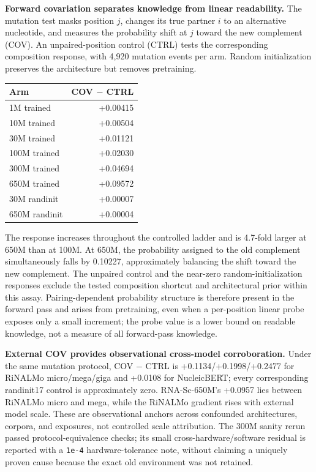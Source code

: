\textbf{Forward covariation separates knowledge from linear readability.} The mutation test masks position \(j\), changes its true partner \(i\) to an alternative nucleotide, and measures the probability shift at \(j\) toward the new complement (COV). An unpaired-position control (CTRL) tests the corresponding composition response, with 4,920 mutation events per arm. Random initialization preserves the architecture but removes pretraining.

\begin{longtable}[]{@{}lr@{}}
\toprule
Arm & COV \(-\) CTRL \\
\midrule
\endhead
1M trained & +0.00415 \\
10M trained & +0.00504 \\
30M trained & +0.01121 \\
100M trained & +0.02030 \\
300M trained & +0.04694 \\
650M trained & +0.09572 \\
30M randinit & +0.00007 \\
650M randinit & +0.00004 \\
\bottomrule
\end{longtable}

The response increases throughout the controlled ladder and is 4.7-fold larger at 650M than at 100M. At 650M, the probability assigned to the old complement simultaneously falls by 0.10227, approximately balancing the shift toward the new complement. The unpaired control and the near-zero random-initialization responses exclude the tested composition shortcut and architectural prior within this assay. Pairing-dependent probability structure is therefore present in the forward pass and arises from pretraining, even when a per-position linear probe exposes only a small increment; the probe value is a lower bound on readable knowledge, not a measure of all forward-pass knowledge.

\textbf{External COV provides observational cross-model corroboration.} Under the same mutation protocol, COV \(-\) CTRL is +0.1134/+0.1998/+0.2477 for RiNALMo micro/mega/giga and +0.0108 for NucleicBERT; every corresponding randinit17 control is approximately zero. RNA-Sc-650M's +0.0957 lies between RiNALMo micro and mega, while the RiNALMo gradient rises with external model scale. These are observational anchors across confounded architectures, corpora, and exposures, not controlled scale attribution. The 300M sanity rerun passed protocol-equivalence checks; its small cross-hardware/software residual is reported with a \texttt{1e-4} hardware-tolerance note, without claiming a uniquely proven cause because the exact old environment was not retained.

